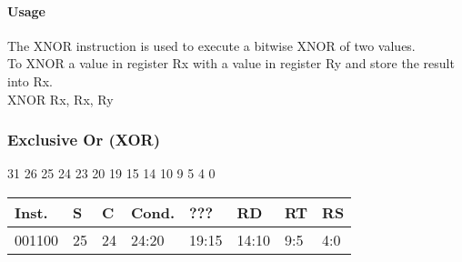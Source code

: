 \documentclass[12pt]{article}
\begin{document}
    \paragraph{Usage}
    \begin{flushleft}
    The XNOR instruction is used to execute a bitwise XNOR of two values.\\
    \vspace{1em}
    To XNOR a value in register Rx with a value in register Ry and store the result into Rx.\\
    \vspace{1em}
    XNOR Rx, Rx, Ry
    \end{flushleft}
   
   




    \newpage
    \subsubsection{Exclusive Or (XOR)}
    
    \hspace{1.6cm}31 \hspace{1.2cm}26 \hspace{.075cm}25 \hspace{.15cm}24 \hspace{.075cm}23 \hspace{.875cm}20 \hspace{.04cm}19 \hspace{.8cm}15 \hspace{.04cm}14 \hspace{.8cm}10 \hspace{.04cm}9 \hspace{1.15cm}5 \hspace{.04cm}4 \hspace{1.25cm}0
    \vspace{-.25cm}
    \begin{center}
        \begin{tabular}{ |p{1.8cm}|p{.3cm}|p{.3cm}|p{1.5cm}|p{1.5cm}|p{1.5cm}|p{1.5cm}|p{1.5cm}| }
            \hline
            \textbf{Inst.} & \textbf{S}& \textbf{C} & \textbf{Cond.} & ??? & \textbf{RD} & \textbf{RT} & \textbf{RS}\\
            \hline
            001100& 25 & 24 & 24:20 & 19:15 & 14:10 & 9:5 & 4:0\\
            \hline
        \end{tabular}
    \end{center}
    
\end{document}
